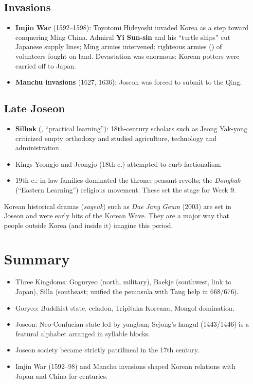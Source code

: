 \subsection{Invasions}

\begin{itemize}
  \item \textbf{Imjin War} (1592--1598): Toyotomi Hideyoshi invaded Korea as a step toward
        conquering Ming China. Admiral \textbf{Yi Sun-sin} and his ``turtle ships'' cut
        Japanese supply lines; Ming armies intervened; righteous armies () of
        volunteers fought on land. Devastation was enormous; Korean potters were
        carried off to Japan.
  \item \textbf{Manchu invasions} (1627, 1636): Joseon was forced to submit to the Qing.
\end{itemize}

\subsection{Late Joseon}

\begin{itemize}
  \item \textbf{Silhak} (, ``practical learning''): 18th-century scholars such as
        Jeong Yak-yong criticized empty orthodoxy and studied agriculture, technology and
        administration.
  \item Kings Yeongjo and Jeongjo (18th c.) attempted to curb factionalism.
  \item 19th c.: in-law families dominated the throne; peasant revolts; the
        \emph{Donghak} (``Eastern Learning'') religious movement. These set the stage for
        Week 9.
\end{itemize}

\begin{aside}
Korean historical dramas (\emph{sageuk}) such as \emph{Dae Jang Geum} (2003) are set in
Joseon and were early hits of the Korean Wave. They are a major way that people outside
Korea (and inside it) imagine this period.
\end{aside}

\section*{Summary}
\begin{itemize}
  \item Three Kingdoms: Goguryeo (north, military), Baekje (southwest, link to Japan),
        Silla (southeast; unified the peninsula with Tang help in 668/676).
  \item Goryeo: Buddhist state, celadon, Tripitaka Koreana, Mongol domination.
  \item Joseon: Neo-Confucian state led by yangban; Sejong's hangul (1443/1446) is a
        featural alphabet arranged in syllable blocks.
  \item Joseon society became strictly patrilineal in the 17th century.
  \item Imjin War (1592--98) and Manchu invasions shaped Korean relations with Japan and
        China for centuries.
\end{itemize}
